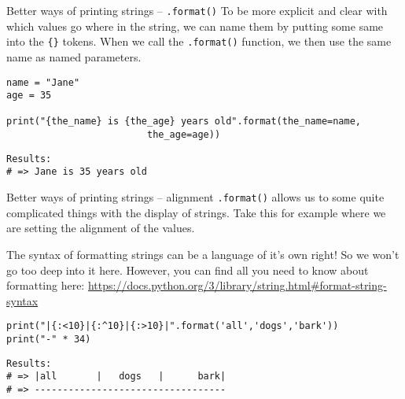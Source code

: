 \documentclass[10pt]{beamer}
\begin{document}
\begin{frame}[label={sec:orgf926d1f},fragile]{Better ways of printing strings -- \texttt{.format()}}
 To be more explicit and clear with which values go where in the string, we can name
them by putting some same into the \texttt{\{\}} tokens. When we call the \texttt{.format()} function, we
then use the same name as named parameters.

\begin{verbatim}
name = "Jane"
age = 35

print("{the_name} is {the_age} years old".format(the_name=name,
						 the_age=age))
\end{verbatim}

\begin{verbatim}
Results: 
# => Jane is 35 years old
\end{verbatim}
\end{frame}

\begin{frame}[label={sec:org31ee4d4},fragile]{Better ways of printing strings -- alignment}
 \texttt{.format()} allows us to some quite complicated things with the display of
strings. Take this for example where we are setting the alignment of the values.

The syntax of formatting strings can be a language of it's own right! So we won't go
too deep into it here. However, you can find all you need to know about formatting
here: \url{https://docs.python.org/3/library/string.html\#format-string-syntax}

\begin{verbatim}
print("|{:<10}|{:^10}|{:>10}|".format('all','dogs','bark'))
print("-" * 34)
\end{verbatim}

\begin{verbatim}
Results: 
# => |all       |   dogs   |      bark|
# => ----------------------------------
\end{verbatim}
\end{frame}
\end{document}
